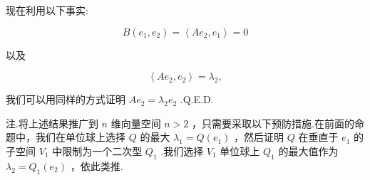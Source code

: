 现在利用以下事实:

\[
B\left( {{e}_{1},{e}_{2}}\right)  = \left\langle  {A{e}_{2},{e}_{1}}\right\rangle   = 0
\]

以及

\[
\left\langle  {A{e}_{2},{e}_{2}}\right\rangle   = {\lambda }_{2},
\]

我们可以用同样的方式证明 \(A{e}_{2} = {\lambda }_{2}{e}_{2}\) .Q.E.D.

注.将上述结果推广到 \(n\) 维向量空间 \(n > 2\) ，只需要采取以下预防措施.在前面的命题中，我们在单位球上选择 \(Q\) 的最大 \({\lambda }_{1} = Q\left( {e}_{1}\right)\) ，然后证明 \(Q\) 在垂直于 \({e}_{1}\) 的子空间 \({V}_{1}\) 中限制为一个二次型 \({Q}_{1}\) .我们选择 \({V}_{1}\) 单位球上 \({Q}_{1}\) 的最大值作为 \({\lambda }_{2} = {Q}_{1}\left( {e}_{2}\right)\) ，依此类推.
